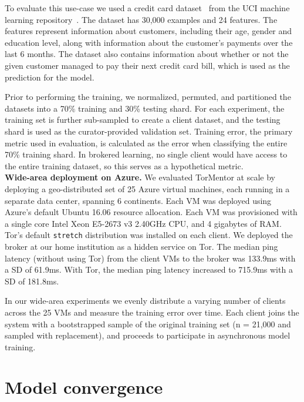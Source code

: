 To evaluate this use-case we used a credit card
dataset~\cite{Yeh:2009} from the \ac{UCI} machine learning
repository~\cite{Lichman:2013}. The dataset has 30,000 examples and
24 features. The features represent information about customers,
including their age, gender and education level, along with
information about the customer's payments over the last 6 months. The
dataset also contains information about whether or not the given
customer managed to pay their next credit card bill, which is used as
the prediction for the model.
 
Prior to performing the training, we normalized, permuted, and
partitioned the datasets into a 70\% training and 30\% testing shard.
For each experiment, the training set is further sub-sampled to create
a client dataset, and the testing shard is used as the
curator-provided validation set. Training error, the primary metric
used in evaluation, is calculated as the error when classifying the
entire 70\% training shard. In brokered learning, no single client
would have access to the entire training dataset, so this serves as a
hypothetical metric. \\

\noindent \textbf{Wide-area deployment on Azure.}  
We evaluated TorMentor at scale by deploying a geo-distributed set of
25 Azure virtual machines, each running in a separate data center, spanning 6
continents. Each \ac{VM} was deployed using Azure's
default Ubuntu 16.06 resource allocation. Each \ac{VM} was provisioned with
a single core Intel Xeon E5-2673 v3 2.40GHz \ac{CPU}, and 4 gigabytes of \ac{RAM}.
Tor's default \texttt{stretch} distribution was installed on each client.
We deployed the broker at our home institution as a hidden service on
Tor. The median ping latency (without using Tor) from the client
VMs to the broker was 133.9ms with a \ac{SD} of 61.9ms.
With Tor, the median ping latency increased to 715.9ms with a \ac{SD} of
181.8ms.

In our wide-area experiments we evenly distribute a varying number of
clients across the 25 VMs and measure the training error over
time. Each client joins the system with a bootstrapped sample of the
original training set (n = 21,000 and sampled with replacement), and
proceeds to participate in asynchronous model training.


\section{Model convergence}
\label{eval:diffpriv}

